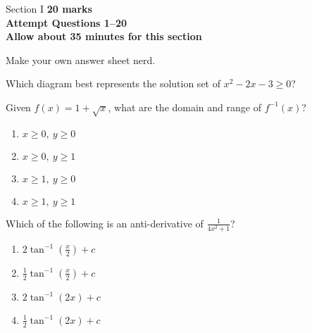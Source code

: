 \begin{sectionheader}{Section I}
    \textbf{20 marks\\
    Attempt Questions 1--20\\
    Allow about 35 minutes for this section}
    
    Make your own answer sheet nerd.
\end{sectionheader}

\begin{multiplechoice}              %

    \item Which diagram best represents the solution set of $x^2-2x-3\ge 0$?                %
    \begin{enumerate}               %
    \begin{multicols}{2}            %
        \item {}    %
        \item {}
        \item {}
        \item {}
    \end{multicols}
    \end{enumerate}

    \item Given $f(x)=1+\sqrt{x}$, what are the domain and range of $f^{-1}(x)$?    %
    \begin{enumerate}               %
        \item $x\ge 0,\ y\ge 0$     %
        \item $x\ge 0,\ y\ge 1$
        \item $x\ge 1,\ y\ge 0$
        \item $x\ge 1,\ y\ge 1$
    \end{enumerate}    

    \item Which of the following is an anti-derivative of $\displaystyle\frac{1}{4x^2+1}$?
    \begin{enumerate}          
        \item $\displaystyle2\tan^{-1}{\left(\frac{x}{2}\right)}+c$    
        \item $\displaystyle\frac{1}{2}\tan^{-1}{\left(\frac{x}{2}\right)}+c$
        \item $2\tan^{-1}{(2x)}+c$
        \item $\displaystyle\frac{1}{2}\tan^{-1}{(2x)}+c$
    \end{enumerate}    
    

\end{multiplechoice}
